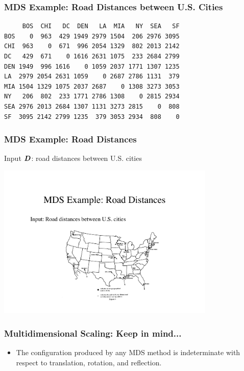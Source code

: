 \documentclass{beamer}
\begin{document}
\begin{frame}[fragile]
  \frametitle{MDS Example: Road Distances between U.S. Cities}

\begin{center}
\begin{verbatim}
     BOS  CHI   DC  DEN   LA  MIA   NY  SEA   SF
BOS    0  963  429 1949 2979 1504  206 2976 3095
CHI  963    0  671  996 2054 1329  802 2013 2142
DC   429  671    0 1616 2631 1075  233 2684 2799
DEN 1949  996 1616    0 1059 2037 1771 1307 1235
LA  2979 2054 2631 1059    0 2687 2786 1131  379
MIA 1504 1329 1075 2037 2687    0 1308 3273 3053
NY   206  802  233 1771 2786 1308    0 2815 2934
SEA 2976 2013 2684 1307 1131 3273 2815    0  808
SF  3095 2142 2799 1235  379 3053 2934  808    0
\end{verbatim}
\end{center}

\end{frame}



\begin{frame}
  \frametitle{MDS Example: Road Distances}

Input $\bm{D}$: road distances between U.S. cities

\begin{center}
\includegraphics[height=2.9in]{mds-road}
\end{center}

\end{frame}

\begin{frame}
  \frametitle{Multidimensional Scaling: Keep in mind...}

\begin{itemize}
\item The configuration produced by any MDS method is indeterminate with respect to translation, rotation, and reflection.

\end{itemize}


\end{frame}
\end{document}
